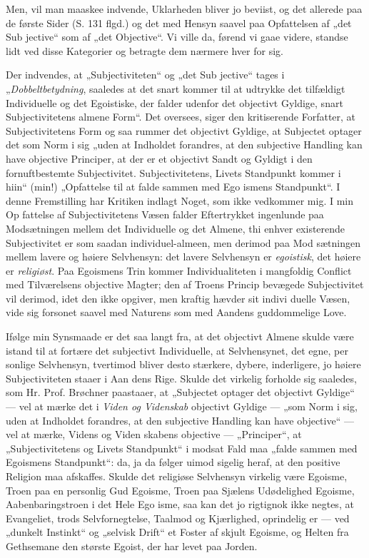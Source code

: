 \documentclass[12pt]{book}
\newcommand{\opage}[1]{\marginnote{\footnotesize\textit{[#1]}}}
\begin{document}
Men, vil man maaskee indvende, Uklarheden bliver
jo beviist, og det allerede paa de første Sider (S. 131 flgd.)
og det med Hensyn saavel paa Opfattelsen af „det Sub\-%
jective“ som af „det Objective“. Vi ville da, førend vi
gaae videre, standse lidt ved disse Kategorier og betragte
dem nærmere hver for sig.

Der indvendes, at „Subjectiviteten“ og „det Sub\-%
jective“ tages i „\emph{Dobbeltbetydning}, saaledes at det
snart kommer til at udtrykke det tilfældigt Individuelle
og det Egoistiske, der falder udenfor det objectivt Gyldige,
snart Subjectivitetens almene Form“. Det oversees, siger
den kritiserende Forfatter, at Subjectivitetens Form og\-%
saa rummer det objectivt Gyldige, at Subjectet optager
det som Norm i sig „uden at Indholdet forandres, at den
subjective Handling kan have objective Principer, at der
er et objectivt Sandt og Gyldigt i den fornuftbestemte
Subjectivitet. Subjectivitetens, Livets Standpunkt kommer
i hiin“ (min!) „Opfattelse til at falde sammen med Ego\-%
ismens Standpunkt“. I denne Fremstilling har Kritiken
indlagt Noget, som ikke vedkommer mig. I min Op\-%
fattelse af Subjectivitetens Væsen falder Eftertrykket
ingenlunde paa Modsætningen mellem det Individuelle
og det Almene, thi enhver existerende Subjectivitet er
som saadan individuel-almeen, men derimod paa Mod\-%
sætningen mellem lavere og høiere Selvhensyn: det lavere
Selvhensyn er \emph{egoistisk}, det høiere er \emph{religiøst}. Paa
Egoismens Trin kommer Individualiteten i mangfoldig
Conflict med Tilværelsens objective Magter; den af
Troens Princip bevægede Subjectivitet vil derimod, idet
den ikke opgiver, men kraftig hævder sit indivi\-%
duelle Væsen, vide sig forsonet saavel med Naturens
som med Aandens guddommelige Love.

\opage{11}\setcounter{footnote}{0}%
Ifølge min Synsmaade er det saa langt fra, at det
objectivt Almene skulde være istand til at fortære det
subjectivt Individuelle, at Selvhensynet, det egne, per\-%
sonlige Selvhensyn, tvertimod bliver desto stærkere,
dybere, inderligere, jo høiere Subjectiviteten staaer i Aan\-%
dens Rige. Skulde det virkelig forholde sig saaledes,
som Hr. Prof. Brøchner paastaaer, at „Subjectet optager
det objectivt Gyldige“ --- vel at mærke det i \emph{Viden
og Videnskab} objectivt Gyldige --- „som Norm i sig,
uden at Indholdet forandres, at den subjective Handling
kan have objective“ --- vel at mærke, Videns og Viden\-%
skabens objective --- „Principer“, at „Subjectivitetens og
Livets Standpunkt“ i modsat Fald maa „falde sammen
med Egoismens Standpunkt“: da, ja da følger uimod\-%
sigelig heraf, at den positive Religion maa afskaffes.
Skulde det religiøse Selvhensyn virkelig være Egoisme,
Troen paa en personlig Gud Egoisme, Troen paa Sjælens
Udødelighed Egoisme, Aabenbaringstroen i det Hele Ego\-%
isme, saa kan det jo rigtignok ikke negtes, at Evangeliet, trods
Selvfornegtelse, Taalmod og Kjærlighed, oprindelig er ---
ved „dunkelt Instinkt“ og „selvisk Drift“ et Foster af skjult
Egoisme, og Helten fra Gethsemane den største Egoist,
der har levet paa Jorden.
\end{document}
